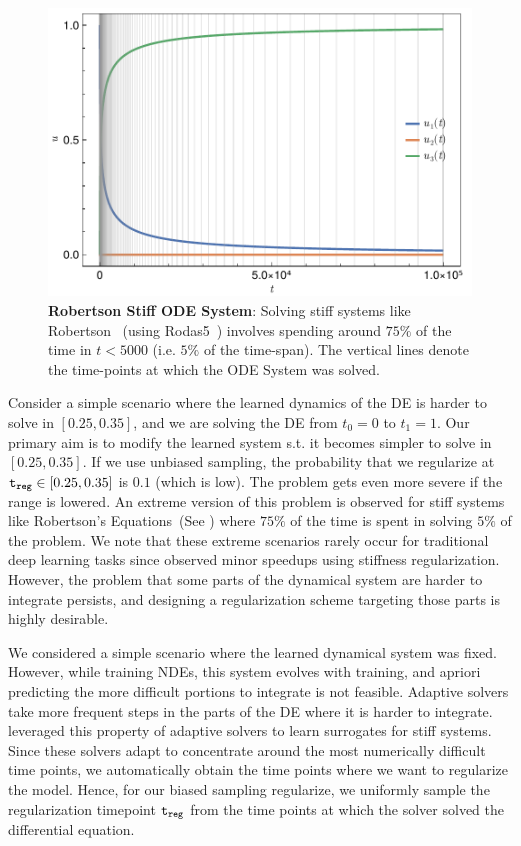 \begin{figure}[t]
  \centering
  \includegraphics[width=0.5\linewidth]{../figures/regularizing_neural_des/biased_sampling_robertson_example}
  \caption{\textbf{Robertson Stiff ODE System}: Solving stiff systems like Robertson~\citep{robertson1966solution} (using Rodas5~\citep{piche1995stable}) involves spending around $75\%$ of the time in $t < 5000$ (i.e. $5\%$ of the time-span). The vertical lines denote the time-points at which the ODE System was solved.}
  \label{fig:robertson_stiff_system}
  \vspace{-1.5em}
\end{figure}


Consider a simple scenario where the learned dynamics of the DE is harder to solve in $\left[0.25, 0.35\right]$, and we are solving the DE from $t_0 = 0$ to $t_1 = 1$. Our primary aim is to modify the learned system s.t. it becomes simpler to solve in $\left[0.25, 0.35\right]$. If we use unbiased sampling, the probability that we regularize at $\texttt{t}_{\texttt{reg}} \in \left[0.25, 0.35\right]$ is $0.1$ (which is low). The problem gets even more severe if the range is lowered. An extreme version of this problem is observed for stiff systems like Robertson's Equations~(See ) where $75\%$ of the time is spent in solving $5\%$ of the problem. We note that these extreme scenarios rarely occur for traditional deep learning tasks since \citet{pal2021opening} observed minor speedups using stiffness regularization. However, the problem that some parts of the dynamical system are harder to integrate persists, and designing a regularization scheme targeting those parts is highly desirable.

We considered a simple scenario where the learned dynamical system was fixed. However, while training NDEs, this system evolves with training, and apriori predicting the more difficult portions to integrate is not feasible. Adaptive solvers take more frequent steps in the parts of the DE where it is harder to integrate. \citet{anantharaman2020accelerating} leveraged this property of adaptive solvers to learn surrogates for stiff systems. Since these solvers adapt to concentrate around the most numerically difficult time points, we automatically obtain the time points where we want to regularize the model. Hence, for our biased sampling regularize, we uniformly sample the regularization timepoint $\texttt{t}_{\texttt{reg}}$ from the time points at which the solver solved the differential equation.

